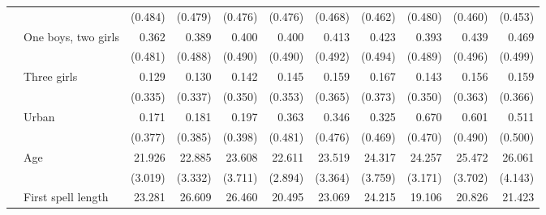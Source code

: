 \begin{table}
\begin{center}
\begin{scriptsize}
\begin{threeparttable}
\begin{tabular} {@{} c l D{.}{.}{1.3} D{.}{.}{1.3} D{.}{.}{1.3} D{.}{.}{1.3} D{.}{.}{1.3} D{.}{.}{1.3} D{.}{.}{1.3} D{.}{.}{1.3} D{.}{.}{1.3} @{}}
                    &                     &     (0.484)         &     (0.479)         &     (0.476)         &     (0.476)         &     (0.468)         &     (0.462)         &     (0.480)         &     (0.460)         &     (0.453)         \\
                    & One boys, two girls &       0.362         &       0.389         &       0.400         &       0.400         &       0.413         &       0.423         &       0.393         &       0.439         &       0.469         \\
                    &                     &     (0.481)         &     (0.488)         &     (0.490)         &     (0.490)         &     (0.492)         &     (0.494)         &     (0.489)         &     (0.496)         &     (0.499)         \\
                    & Three girls         &       0.129         &       0.130         &       0.142         &       0.145         &       0.159         &       0.167         &       0.143         &       0.156         &       0.159         \\
                    &                     &     (0.335)         &     (0.337)         &     (0.350)         &     (0.353)         &     (0.365)         &     (0.373)         &     (0.350)         &     (0.363)         &     (0.366)         \\
                    & Urban               &       0.171         &       0.181         &       0.197         &       0.363         &       0.346         &       0.325         &       0.670         &       0.601         &       0.511         \\
                    &                     &     (0.377)         &     (0.385)         &     (0.398)         &     (0.481)         &     (0.476)         &     (0.469)         &     (0.470)         &     (0.490)         &     (0.500)         \\
                    & Age                 &      21.926         &      22.885         &      23.608         &      22.611         &      23.519         &      24.317         &      24.257         &      25.472         &      26.061         \\
                    &                     &     (3.019)         &     (3.332)         &     (3.711)         &     (2.894)         &     (3.364)         &     (3.759)         &     (3.171)         &     (3.702)         &     (4.143)         \\
                    & First spell length  &      23.281         &      26.609         &      26.460         &      20.495         &      23.069         &      24.215         &      19.106         &      20.826         &      21.423         \\

\end{tabular}
\end{threeparttable}
\end{scriptsize}
\end{center}
\end{table}
